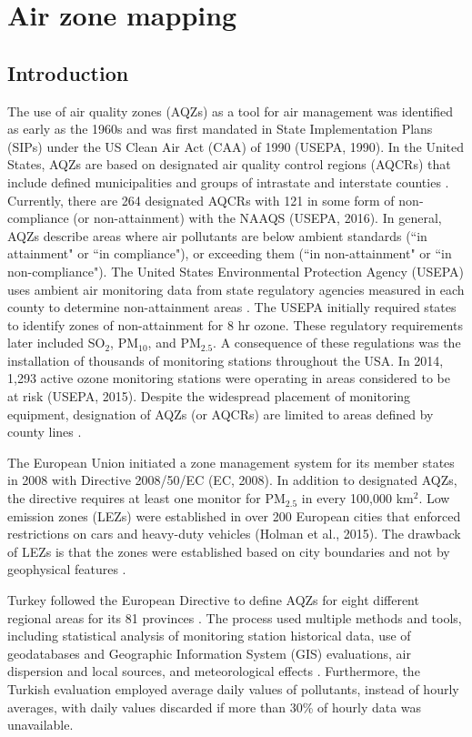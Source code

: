 \chapter{Air zone mapping}

\section{Introduction}

The use of air quality zones (AQZs) as a tool for air management was identified as early as the 1960s \citep{Breivogel1961, Holland1960} and was first mandated in State Implementation Plans (SIPs) under the US Clean Air Act (CAA) of 1990 (USEPA, 1990). In the United States, AQZs are based on designated air quality control regions (AQCRs) that include defined municipalities and groups of intrastate and interstate counties \citep{USEPA1970a}. Currently, there are 264 designated AQCRs with 121 in some form of non-compliance (or non-attainment) with the NAAQS (USEPA, 2016). In general, AQZs describe areas where air pollutants are below ambient standards (``in attainment" or ``in compliance"), or exceeding them (``in non-attainment" or ``in non-compliance").  The United States Environmental Protection Agency (USEPA) uses ambient air monitoring data from state regulatory agencies measured in each county to determine non-attainment areas \citep{Carr2012}.  The USEPA initially required states to identify zones of non-attainment for 8 hr ozone.  These regulatory requirements later included SO$_{2}$, PM$_{10}$, and PM$_{2.5}$.  A consequence of these regulations was the installation of thousands of monitoring stations throughout the USA.  In 2014, 1,293 active ozone monitoring stations were operating in areas considered to be at risk (USEPA, 2015).  Despite the widespread placement of monitoring equipment, designation of AQZs (or AQCRs) are limited to areas defined by county lines \citep{Carr2012}.

The European Union initiated a zone management system for its member states in 2008 with Directive 2008/50/EC (EC, 2008).  In addition to designated AQZs, the directive requires at least one monitor for PM$_{2.5}$ in every 100,000 km$^{2}$.  Low emission zones (LEZs) were established in over 200 European cities that enforced restrictions on cars and heavy-duty vehicles (Holman et al., 2015).  The drawback of LEZs is that the zones were established based on city boundaries and not by geophysical features \citep{Henschel2013}.

Turkey followed the European Directive to define AQZs for eight different regional areas for its 81 provinces \citep{CYGM2010}.  The process used multiple methods and tools, including statistical analysis of monitoring station historical data, use of geodatabases and Geographic Information System (GIS) evaluations, air dispersion and local sources, and meteorological effects \citep{Karaca2012}.  Furthermore, the Turkish evaluation employed average daily values of pollutants, instead of hourly averages, with daily values discarded if more than 30\% of hourly data was unavailable.  

